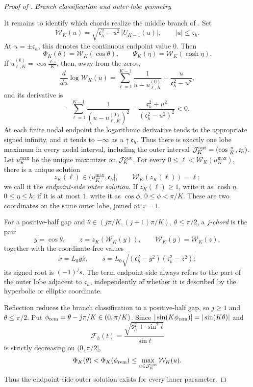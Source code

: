 \documentclass[12pt,anonymous]{iopjournal}
\numberwithin{equation}{section}
\theoremstyle{remark}
\newcommand{\proofstage}[1]{%
  \par\medskip\noindent\textit{#1}\par\nobreak\smallskip}
\begin{document}
\begin{proof}[Proof of ]
\proofstage{Branch classification and outer-lobe geometry}
It remains to identify which chords realize the middle branch of
.  Set
\begin{equation}\label{eq:Wcal-def}
 \mathcal W_K(u)=\sqrt{\mathfrak c_h^2-u^2}\,|U_{K-1}(u)|,
 \qquad |u|\leq\mathfrak c_h.
\end{equation}
At \(u=\pm\mathfrak c_h\), this denotes the continuous endpoint value
\(0\).
Then
\[
 \Phi_K(\theta)=\mathcal W_K(\cos\theta),\qquad
 \Psi_K(\eta)=\mathcal W_K(\cosh\eta).
\]
If \(u_{\ell,K}^{(0)}=\cos\frac{\ell\pi}{K}\), then, away from the zeros,
\[
 \frac{d}{du}\log\mathcal W_K(u)
 =\sum_{\ell=1}^{K-1}\frac1{u-u_{\ell,K}^{(0)}}
 -\frac{u}{\mathfrak c_h^2-u^2},
\]
and its derivative is
\begin{equation}\label{eq:W-log-concave}
 -\sum_{\ell=1}^{K-1}\frac1{(u-u_{\ell,K}^{(0)})^2}
 -\frac{\mathfrak c_h^2+u^2}{(\mathfrak c_h^2-u^2)^2}<0.
\end{equation}
At each finite nodal endpoint the logarithmic derivative tends to the
appropriate signed infinity, and it tends to \(-\infty\) as
\(u\uparrow\mathfrak c_h\).  Thus there is exactly one lobe maximum in
every nodal
interval, including the outer interval
\(\mathcal J_K^{\rm out}=(\cos\frac{\pi}{K},\mathfrak c_h)\).  Let
\(u_K^{\max}\) be the unique maximizer on \(\mathcal J_K^{\rm out}\).
For every
\(0\leq\ell<\mathcal W_K(u_K^{\max})\), there is a unique solution
\[
 z_K(\ell)\in(u_K^{\max},\mathfrak c_h],\qquad
 \mathcal W_K(z_K(\ell))=\ell;
\]
we call it the \emph{endpoint-side outer solution}.  If
\(z_K(\ell)\geq1\), write it as \(\cosh\eta\),
\(0\leq\eta\leq h\); if it is at most \(1\), write it as
\(\cos\phi\), \(0\leq\phi<\pi/K\).  These are two coordinates on the
same outer lobe, joined at \(z=1\).

For a positive-half gap and
\(\theta\in(j\pi/K,(j+1)\pi/K)\), \(\theta\leq\pi/2\), a
\emph{$j$-chord} is the pair
\[
 y=\cos\theta,\qquad
 z=z_K(\mathcal W_K(y)),\qquad
 \mathcal W_K(y)=\mathcal W_K(z),
\]
together with the coordinate-free values
\[
 x=L_0yz,\qquad
 s=L_0\sqrt{(\mathfrak c_h^2-y^2)(\mathfrak c_h^2-z^2)};
\]
its signed root is
\((-1)^js\).  The term endpoint-side always refers to the part of the
outer lobe adjacent to \(\mathfrak c_h\), independently of whether it is
described by the hyperbolic or elliptic coordinate.

Reflection reduces the branch classification to a positive-half gap, so
\(j\geq1\)
and \(\theta\leq\pi/2\).  Put
\(\phi_{\rm rem}=\theta-j\pi/K\in(0,\pi/K)\).  Since
\(|\sin(K\phi_{\rm rem})|=|\sin(K\theta)|\) and
\[
 \mathcal F_h(t)=
 \frac{\sqrt{\mathfrak s_h^2+\sin^2t}}{\sin t}
\]
is strictly decreasing on \((0,\pi/2]\),
\begin{equation}\label{eq:outer-level-dominates}
 \Phi_K(\theta)<\Phi_K(\phi_{\rm rem})
 \leq\max_{u\in\mathcal J_K^{\rm out}}\mathcal W_K(u).
\end{equation}
Thus the endpoint-side outer solution exists for every inner parameter.


\end{proof}
\end{document}
